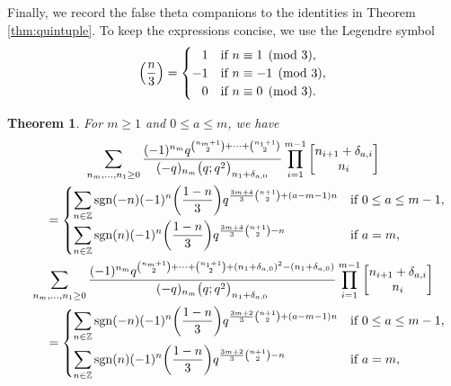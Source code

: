 \documentclass[pdftex]{sigma}
\newtheorem{Theorem}{Theorem}[section]
\numberwithin{equation}{section}
\begin{document}
Finally, we record the false theta companions to the identities in Theorem \ref{thm:quintuple}. To keep the expressions concise, we use the Legendre symbol
\begin{equation*}
\Bigl(\frac{n}{3}\Bigr) =
\begin{cases}
	\hphantom{-}1 & \text{if $n \equiv 1 \pmod{3}$}, \\
	-1 & \text{if $n \equiv -1 \pmod{3}$}, \\
	\hphantom{-}0 & \text{if $n \equiv 0 \pmod{3}$}.
\end{cases}
\end{equation*}

\begin{Theorem} \label{thm:falsequintuple}
For $m \geq 1$ and $0 \leq a \leq m$, we have
\begin{gather}
		\sum_{n_m, \dots, n_1 \geq 0} \frac{(-1)^{n_m}q^{\binom{n_m + 1}{2} + \cdots + \binom{n_1+1}{2}}}{(-q)_{n_m}\bigl(q;q^2\bigr)_{n_1 + \delta_{a,0}}} \prod_{i=1}^{m-1} \begin{bmatrix} n_{i+1} + \delta_{a,i} \\ n_i \end{bmatrix}\nonumber \\
		\qquad{}=
		\begin{cases}
			\displaystyle \sum_{n \in \mathbb{Z}} {\rm sgn}(-n)(-1)^n\biggl(\frac{1-n}{3}\biggr) q^{\frac{3m+4}{3}\binom{n+1}{2} + (a-m-1)n} & \text{if $0 \leq a \leq m-1$}, \\
			\displaystyle \sum_{n \in \mathbb{Z}} {\rm sgn}(n)(-1)^n\biggl(\frac{1-n}{3}\biggr) q^{\frac{3m+4}{3}\binom{n+1}{2} - n} & \text{if $a=m$},
		\end{cases}
 \label{eqn:falsequintupleeq1}\\
		\sum_{n_m, \dots, n_1 \geq 0} \frac{(-1)^{n_m}q^{\binom{n_m + 1}{2} + \cdots + \binom{n_1+1}{2} + (n_1+\delta_{a,0})^2 - (n_1 + \delta_{a,0})}}{(-q)_{n_m}\bigl(q;q^2\bigr)_{n_1 + \delta_{a,0}}} \prod_{i=1}^{m-1} \begin{bmatrix} n_{i+1} + \delta_{a,i} \\ n_i \end{bmatrix} \nonumber \\
		\qquad{}=
		\begin{cases}
			\displaystyle \sum_{n \in \mathbb{Z}} {\rm sgn}(-n)(-1)^n\biggl(\frac{1-n}{3}\biggr) q^{\frac{3m+2}{3}\binom{n+1}{2} + (a-m-1)n} & \text{if $0 \leq a \leq m-1$}, \vspace{1mm}\\
			\displaystyle \sum_{n \in \mathbb{Z}} {\rm sgn}(n)(-1)^n\biggl(\frac{1-n}{3}\biggr) q^{\frac{3m+2}{3}\binom{n+1}{2} - n} & \text{if $a=m$},

\end{cases}
\end{gather}
\end{Theorem}
\end{document}
